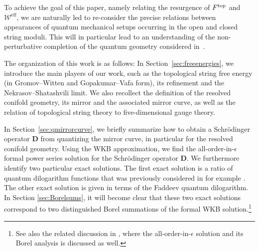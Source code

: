 \documentclass[pdftex]{sigma}
\numberwithin{equation}{section}
\begin{document}
To achieve the goal of this paper, namely relating the resurgence of $F^{\rm top}$ and $\mathcal{W}^{\mathrm{eff}}$, we are naturally led to re-consider the precise relations between appearances of quantum mechanical setups occurring in the open and closed string moduli. This will in particular lead to an understanding of the non-perturbative completion of the quantum geometry considered in~\cite{ACDKV}.

The organization of this work is as follows:
In Section~\ref{sec:freeenergies}, we introduce the main players of our work, such as the topological string free energy (in Gromov--Witten and Gopakumar--Vafa form), its refinement and the Nekrasov--Shatashvili limit. We also recollect the definition of the resolved conifold geometry, its mirror and the associated mirror curve, as well as the relation of topological string theory to five-dimensional gauge theory.

In Section~\ref{sec:qmirrorcurve}, we briefly summarize how to obtain a Schr\"odinger operator $\mathbf{D}$ from quantizing the mirror curve, in particular for the resolved conifold geometry. Using the WKB approximation, we find the all-order-in-$\epsilon$ formal power series solution for the Schr\"odinger operator $\mathbf{D}$. We furthermore identify two particular exact solutions. The first exact solution is a ratio of quantum dilogarithm functions that was previously considered in for example \cite{ACDKV}. The other exact solution is given in terms of the Faddeev quantum dilogarithm. In Section \ref{sec:Borelsums}, it will become clear that these two exact solutions correspond to two distinguished Borel summations of the formal WKB solution.\footnote{See also the related discussion in \cite[Section 4]{GHN}, where the all-order-in-$\epsilon$ solution and its Borel analysis is discussed as well.}
\end{document}
